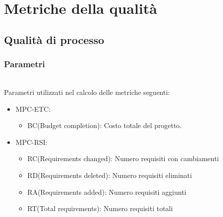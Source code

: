 \section{Metriche della qualità}
\subsection{Qualità di processo}
\subsubsection{Parametri}\mbox{}\\
Parametri utilizzati nel calcolo delle metriche seguenti:
\begin{itemize}

    \item MPC-ETC:
          \begin{itemize}
              \item BC(Budget completion): Costo totale del progetto.
          \end{itemize}
    \item MPC-RSI:
          \begin{itemize}
              \item RC(Requirements changed): Numero requisiti con cambiamenti
              \item RD(Requirements deleted): Numero requisiti eliminati
              \item RA(Requirements added): Numero requisiti aggiunti
              \item RT(Total requirements): Numero requisiti totali
          \end{itemize}
\end{itemize}
